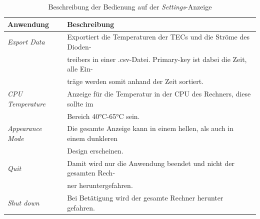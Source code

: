 \begin{table}[H]
    \centering
    \begin{tabular}{l|l}
         \textbf{Anwendung}&        \textbf{Beschreibung}\\
         \hline
         \textit{Export Data}&      Exportiert die Temperaturen der TECs und die Ströme des Dioden-\\
         &                          treibers in einer .csv-Datei. Primary-key ist dabei die Zeit, alle Ein-\\
         &                          träge werden somit anhand der Zeit sortiert.\\
         \textit{CPU Temperature}&  Anzeige für die Temperatur in der CPU des Rechners, diese sollte im\\
         &                          Bereich 40°C-65°C sein.\\
         \textit{Appearance Mode}&  Die gesamte Anzeige kann in einem hellen, als auch in einem dunkleren\\
         &                          Design erscheinen.\\
         \textit{Quit}&             Damit wird nur die Anwendung beendet und nicht der gesamten Rech-\\
         &                          ner heruntergefahren.\\
         \textit{Shut down}&        Bei Betätigung wird der gesamte Rechner herunter gefahren.
    \end{tabular}
    \caption{Beschreibung der Bedienung auf der \textit{Settings}-Anzeige}
    \label{tab:settings_beschriebung_sw}
\end{table}

\nocite{*}